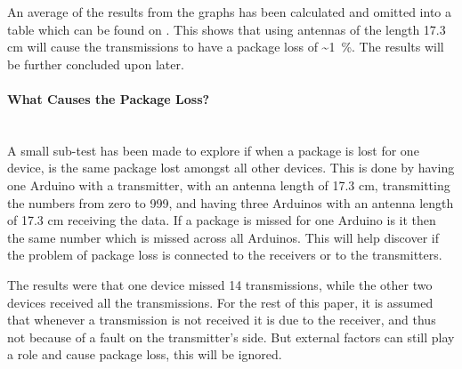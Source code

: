 An average of the results from the graphs has been calculated and omitted into a table which can be found on . 
This shows that using antennas of the length 17.3 cm will cause the transmissions to have a package loss of \textasciitilde1~\%.
The results will be further concluded upon later.

\paragraph{What Causes the Package Loss?}\label{par:wctpl}\hfill \\
A small sub-test has been made to explore if when a package is lost for one device, is the same package lost amongst all other devices.
This is done by having one Arduino with a transmitter, with an antenna length of 17.3 cm, transmitting the numbers from zero to 999, and having three Arduinos with an antenna length of 17.3 cm receiving the data. 
If a package is missed for one Arduino is it then the same number which is missed across all Arduinos.
This will help discover if the problem of package loss is connected to the receivers or to the transmitters.

The results were that one device missed 14 transmissions, while the other two devices received all the transmissions.
For the rest of this paper, it is assumed that whenever a transmission is not received it is due to the receiver, and thus not because of a fault on the transmitter's side.
But external factors can still play a role and cause package loss, this will be ignored.

